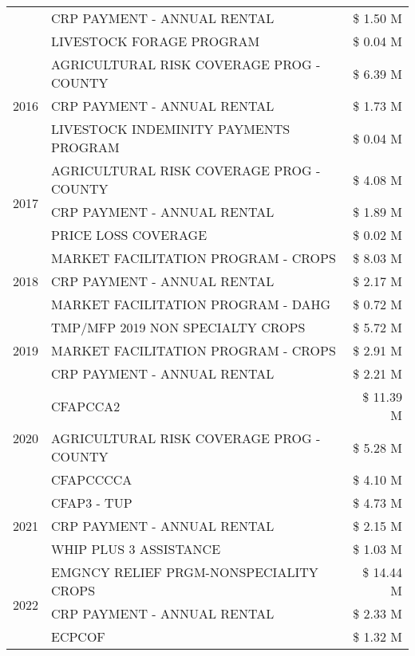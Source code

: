 \begin{tabular}{llr}
 & CRP PAYMENT - ANNUAL RENTAL & \$ 1.50 M \\
 & LIVESTOCK FORAGE PROGRAM & \$ 0.04 M \\
\cline{1-3}
\multirow[t]{3}{*}{2016} & AGRICULTURAL RISK COVERAGE PROG - COUNTY & \$ 6.39 M \\
 & CRP PAYMENT - ANNUAL RENTAL & \$ 1.73 M \\
 & LIVESTOCK INDEMINITY PAYMENTS PROGRAM & \$ 0.04 M \\
\cline{1-3}
\multirow[t]{3}{*}{2017} & AGRICULTURAL RISK COVERAGE PROG - COUNTY & \$ 4.08 M \\
 & CRP PAYMENT - ANNUAL RENTAL & \$ 1.89 M \\
 & PRICE LOSS COVERAGE & \$ 0.02 M \\
\cline{1-3}
\multirow[t]{3}{*}{2018} & MARKET FACILITATION PROGRAM - CROPS & \$ 8.03 M \\
 & CRP PAYMENT - ANNUAL RENTAL & \$ 2.17 M \\
 & MARKET FACILITATION PROGRAM - DAHG & \$ 0.72 M \\
\cline{1-3}
\multirow[t]{3}{*}{2019} & TMP/MFP 2019 NON SPECIALTY CROPS & \$ 5.72 M \\
 & MARKET FACILITATION PROGRAM - CROPS & \$ 2.91 M \\
 & CRP PAYMENT - ANNUAL RENTAL & \$ 2.21 M \\
\cline{1-3}
\multirow[t]{3}{*}{2020} & CFAPCCA2 & \$ 11.39 M \\
 & AGRICULTURAL RISK COVERAGE PROG - COUNTY & \$ 5.28 M \\
 & CFAPCCCCA & \$ 4.10 M \\
\cline{1-3}
\multirow[t]{3}{*}{2021} & CFAP3 - TUP & \$ 4.73 M \\
 & CRP PAYMENT - ANNUAL RENTAL & \$ 2.15 M \\
 & WHIP PLUS 3 ASSISTANCE & \$ 1.03 M \\
\cline{1-3}
\multirow[t]{3}{*}{2022} & EMGNCY RELIEF PRGM-NONSPECIALITY CROPS & \$ 14.44 M \\
 & CRP PAYMENT - ANNUAL RENTAL & \$ 2.33 M \\
 & ECPCOF & \$ 1.32 M \\
\cline{1-3}
\bottomrule
\end{tabular}
